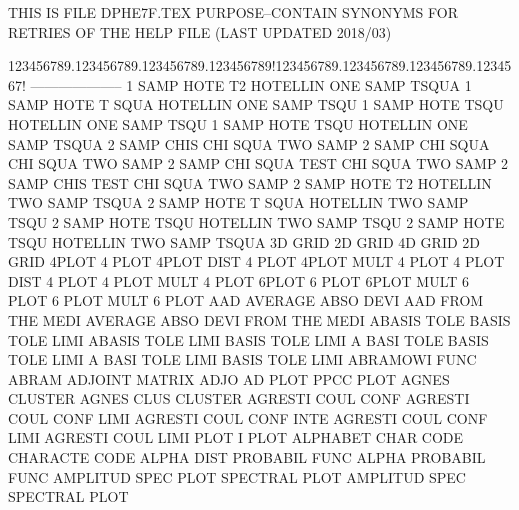 THIS IS FILE DPHE7F.TEX
PURPOSE--CONTAIN SYNONYMS FOR RETRIES OF THE HELP FILE (LAST UPDATED 2018/03)
 
123456789.123456789.123456789.123456789!123456789.123456789.123456789.1234567!
--------------------
1        SAMP HOTE T2                   HOTELLIN ONE  SAMP TSQUA
1        SAMP HOTE T    SQUA            HOTELLIN ONE  SAMP TSQU
1        SAMP HOTE TSQU                 HOTELLIN ONE  SAMP TSQU
1        SAMP HOTE TSQU                 HOTELLIN ONE  SAMP TSQUA
2        SAMP CHIS                      CHI      SQUA TWO  SAMP
2        SAMP CHI  SQUA                 CHI      SQUA TWO  SAMP
2        SAMP CHI  SQUA TEST            CHI      SQUA TWO  SAMP
2        SAMP CHIS TEST                 CHI      SQUA TWO  SAMP
2        SAMP HOTE T2                   HOTELLIN TWO  SAMP TSQUA
2        SAMP HOTE T    SQUA            HOTELLIN TWO  SAMP TSQU
2        SAMP HOTE TSQU                 HOTELLIN TWO  SAMP TSQU
2        SAMP HOTE TSQU                 HOTELLIN TWO  SAMP TSQUA
3D       GRID                           2D       GRID
4D       GRID                           2D       GRID
4PLOT                                   4        PLOT
4PLOT    DIST                           4        PLOT
4PLOT    MULT                           4        PLOT
4        PLOT DIST                      4        PLOT
4        PLOT MULT                      4        PLOT
6PLOT                                   6        PLOT
6PLOT    MULT                           6        PLOT
6        PLOT MULT                      6        PLOT
AAD                                     AVERAGE  ABSO DEVI
AAD      FROM THE  MEDI                 AVERAGE  ABSO DEVI FROM THE  MEDI
ABASIS   TOLE                           BASIS    TOLE LIMI
ABASIS   TOLE LIMI                      BASIS    TOLE LIMI
A        BASI TOLE                      BASIS    TOLE LIMI
A        BASI TOLE LIMI                 BASIS    TOLE LIMI
ABRAMOWI FUNC                           ABRAM
ADJOINT                                 MATRIX   ADJO
AD       PLOT                           PPCC     PLOT
AGNES                                   CLUSTER
AGNES    CLUS                           CLUSTER
AGRESTI  COUL CONF                      AGRESTI  COUL CONF LIMI
AGRESTI  COUL CONF INTE                 AGRESTI  COUL CONF LIMI
AGRESTI  COUL LIMI PLOT                 I        PLOT
ALPHABET CHAR CODE                      CHARACTE CODE
ALPHA    DIST                           PROBABIL FUNC
ALPHA                                   PROBABIL FUNC
AMPLITUD SPEC PLOT                      SPECTRAL PLOT
AMPLITUD SPEC                           SPECTRAL PLOT
